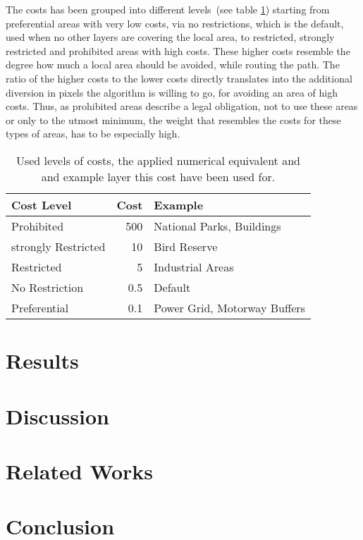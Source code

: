 \documentclass[acmtog]{acmart}
\begin{document}
	The costs has been grouped into different levels~(see table \ref{table:1}) starting from preferential areas with very low costs, via no restrictions, which is the default, used when no other layers are covering the local area, to restricted, strongly restricted and prohibited areas with high costs. These higher costs resemble the degree how much a local area should be avoided, while routing the path. The ratio of the higher costs to the lower costs directly translates into the additional diversion in pixels the algorithm is willing to go, for avoiding an area of high costs.
	Thus, as prohibited areas describe a legal obligation, not to use these areas or only to the utmost minimum, the weight that resembles the costs for these types of areas, has to be especially high.
	
	\begin{table}[h!]
		\caption{Used levels of costs, the applied numerical equivalent and and example layer this cost have been used for.}
		\label{table:1}
		\centering
		\begin{tabular}{ l  r  l }
			Cost Level & Cost &  Example\\
			\hline
			Prohibited & 500					& National Parks, Buildings \\
			strongly Restricted & 10 	& Bird Reserve \\
			Restricted & 5	& Industrial Areas \\
			No Restriction & 0.5					& Default\\
			Preferential & 0.1					& Power Grid, Motorway Buffers\\
		\end{tabular}

	\end{table}

	\section{Results}
	
	\section{Discussion}
	\section{Related Works}
	\section{Conclusion}
\end{document}
